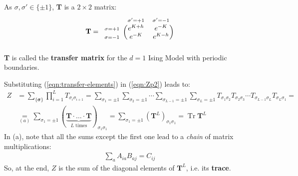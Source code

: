\documentclass[../../main.tex]{subfiles}
\begin{document}
As $\sigma,\sigma' \in \{\pm 1\}$, \textbf{T} is a $2 \times 2$ matrix:
\begin{align*}
    \textbf{T}  = \begin{blockarray}{l*{2}{c}}
        \begin{block}{l*{2}{>{\scriptstyle}c<{}}}
            & \sigma'=+1 & \sigma'=-1 \\
        \end{block}
        \begin{block}{>{\scriptstyle}r<{}(*{2}{c})}
            \sigma=+1 & e^{K+h} & e^{-K} \\
            \sigma=-1 & e^{-K}   & e^{K-h}\\
        \end{block}
    \end{blockarray}
\end{align*}
\textbf{T} is called the \textbf{transfer matrix} for the $d=1$ Ising Model with periodic boundaries. 

Substituting (\ref{eqn:transfer-elements}) in (\ref{eqn:Zp2}) leads to:
\begin{align*}
    Z &= \sum_{\{\bm{\sigma}\}} \prod_{i=1}^L T_{\sigma_i \sigma_{i+1}} = \sum_{\sigma_1 = \pm 1} \sum_{\sigma_2 = \pm 1} \cdots \sum_{\sigma_{L-1} = \pm 1} \sum_{\sigma_L = \pm 1} T_{\sigma_1 \sigma_2} T_{\sigma_2 \sigma_3} \cdots T_{\sigma_{L-1} \sigma_{L}} T_{\sigma_L \sigma_1} =\\
    &\underset{(a)}{=} 
    \sum_{\sigma_1 = \pm 1} (\underbrace{\textbf{T} \cdot \dots \cdot \textbf{T}}_{L \text{ times}})_{\sigma_1 \sigma_1} =
    \sum_{\sigma_1 = \pm 1} (\textbf{T}^L)_{\sigma_1 \sigma_1} = \operatorname{Tr} \textbf{T}^L 
\end{align*}
In (a), note that all the sums except the first one lead to a \textit{chain} of matrix multiplications:
\begin{align*}
    \sum_a A_{ia} B_{aj} = C_{ij}
\end{align*} 
So, at the end, $Z$ is the sum of the diagonal elements of $\textbf{T}^L$, i.e. its \textbf{trace}.

\medskip
\end{document}

